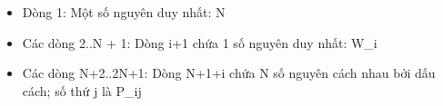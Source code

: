 \begin{itemize}
	\item     Dòng 1: Một số nguyên duy nhất: N   
	\item     Các dòng 2..N + 1: Dòng i+1 chứa 1 số nguyên duy nhất: W\_i   
	\item     Các dòng N+2..2N+1: Dòng N+1+i chứa N số nguyên cách nhau bởi dấu cách; số thứ         j là P\_ij   
\end{itemize}